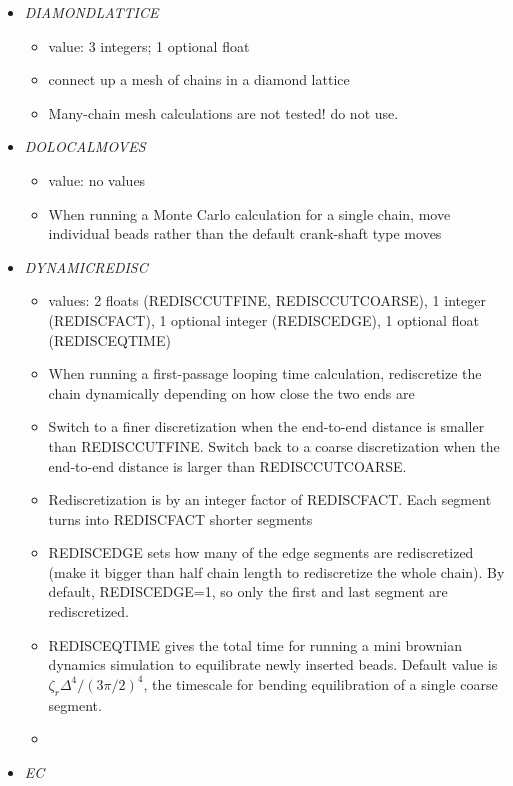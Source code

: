 \documentclass[12pt]{article}
\begin{document}
\begin{itemize}
\begin{itemize}
  \end{itemize}
%
\item {\it DIAMONDLATTICE}
  \begin{itemize}
    \item  value: 3 integers; 1 optional float
    \item connect up a mesh of chains in a diamond lattice
    \item {\color{red} Many-chain mesh calculations are not tested! do not use.}
  \end{itemize}
%
\item {\it DOLOCALMOVES}
  \begin{itemize}
    \item  value: no values
    \item When running a Monte Carlo calculation for a single chain, move individual beads rather than the default crank-shaft type moves
  \end{itemize}
%
\item {\it DYNAMICREDISC}
  \begin{itemize}
    \item  values: 2 floats (REDISCCUTFINE, REDISCCUTCOARSE), 1 integer (REDISCFACT), 1 optional integer (REDISCEDGE), 1 optional float (REDISCEQTIME)
    \item When running a first-passage looping time calculation, rediscretize the chain dynamically depending on how close the two ends are
    \item Switch to a finer discretization when the end-to-end distance is smaller than REDISCCUTFINE. Switch back to a coarse discretization when the end-to-end distance is larger than REDISCCUTCOARSE. 
    \item Rediscretization is by an integer factor of REDISCFACT. Each segment turns into REDISCFACT shorter segments
    \item REDISCEDGE sets how many of the edge segments are rediscretized (make it bigger than half chain length to rediscretize the whole chain). By default, REDISCEDGE=1, so only the first and last segment are rediscretized.
    \item REDISCEQTIME gives the total time for running a mini brownian dynamics simulation to equilibrate newly inserted beads. Default value is $\zeta_r\Delta^4/(3\pi/2)^4$, the timescale for bending equilibration of a single coarse segment.
    \item 
  \end{itemize}
%
\item {\it EC}
  \begin{itemize}

\end{itemize}
\end{itemize}
\end{document}
